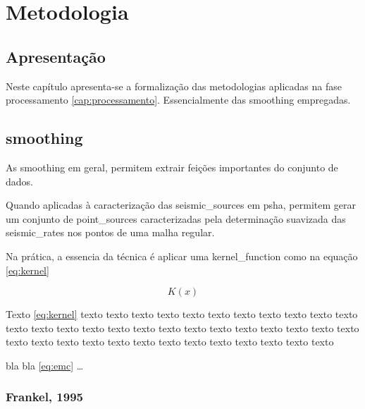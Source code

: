 \chapter{Metodologia}
\label{cap:metodolodia}


\section{Apresentação}
\label{sec:c04_apresentacao}


Neste capítulo apresenta-se a formalização das metodologias aplicadas na fase 
processamento \ref{cap:processamento}. Essencialmente das \gls{smoothing} empregadas.

\section{\Gls{smoothing}}
\label{sec:04_smoothing_general}

As \gls{smoothing} em geral, permitem extrair feições importantes do conjunto de dados.

Quando aplicadas à caracterização das \glspl{seismic_source} em \gls{psha},
permitem gerar um conjunto de \glspl{point_source} 
caracterizadas pela determinação suavizada das \glspl{seismic_rate} 
nos pontos de uma malha regular. 

Na prática, a essencia da técnica é aplicar uma \gls{kernel_function} como na equação \ref{eq:kernel}

\begin{equation}
K(x)
\label{eq:kernel}
\end{equation}


Texto \ref{eq:kernel} texto texto texto texto texto texto texto texto texto
texto texto texto texto texto texto texto texto texto texto texto texto texto texto texto texto
texto texto texto texto texto texto texto texto texto texto texto texto texto

bla bla \eqref{eq:emc} \ldots


\subsection{Frankel, 1995}
\label{sec:acidos_nucleicos}

